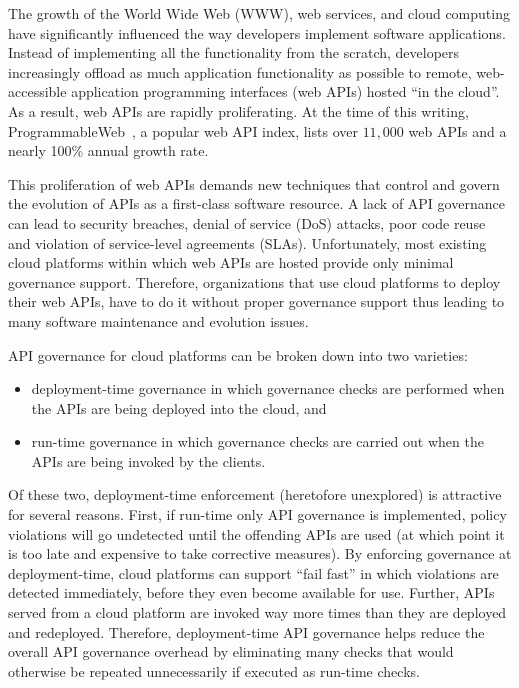 The growth of the World Wide Web (WWW), web services, and cloud computing have
significantly influenced the way developers implement software applications.
Instead of implementing all the functionality from the scratch, developers
increasingly offload as much application functionality as possible to remote,
web-accessible application programming interfaces (web APIs) hosted ``in the
cloud''. As a result, web APIs are rapidly proliferating.
At the time of this writing, 
ProgrammableWeb~\cite{pweb}, a popular web API index, lists over $11,000$
web APIs and a nearly 100\% annual growth rate. 

This proliferation of web APIs demands new techniques that
control and govern the evolution of APIs as a first-class software
resource. A lack of API governance can lead to 
security breaches, denial of service (DoS)
attacks, poor code reuse and violation of service-level agreements (SLAs). 
Unfortunately, most existing cloud platforms
within which web APIs are hosted provide only minimal governance support.
Therefore, organizations that use cloud platforms to deploy their web APIs, have to
do it without proper governance support thus leading to many software maintenance
and evolution issues.

API governance for cloud platforms can be broken down into two varieties:
\begin{itemize}
\item deployment-time governance in which governance checks are performed 
when the APIs are being deployed into the cloud, and
\item run-time governance in which governance checks are carried out when the APIs
are being invoked by the clients.
\end{itemize}
Of these two, 
deployment-time enforcement (heretofore unexplored) is attractive for several
reasons.  First, if run-time only API governance is implemented, 
policy violations will go undetected until the offending APIs are used (at which
point it is too late and expensive to take corrective measures).  
By enforcing governance at deployment-time,
cloud platforms can support ``fail fast'' in which violations are detected
immediately, before they even become available for use. Further, APIs served from a cloud
platform are invoked way more times than they are deployed and redeployed. 
Therefore, deployment-time API governance helps reduce the overall API governance
overhead by eliminating many checks that would otherwise be repeated unnecessarily
if executed as run-time checks.

